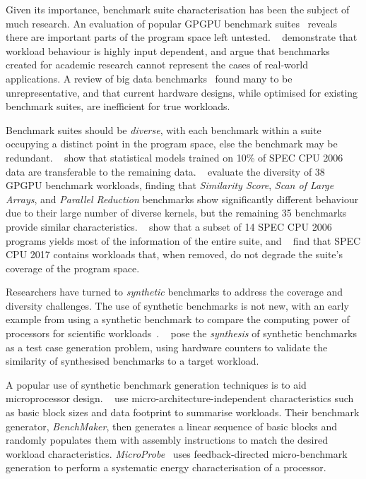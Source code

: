 Given its importance, benchmark suite characterisation has been the subject of much research. An evaluation of popular GPGPU benchmark suites~\cite{Ryoo2015} reveals there are important parts of the program space left untested. \citeauthor{Xiong2013}~\cite{Xiong2013} demonstrate that workload behaviour is highly input dependent, and argue that benchmarks created for academic research cannot represent the cases of real-world applications. A review of big data benchmarks~\cite{Ferdman2012} found many to be unrepresentative, and that current hardware designs, while optimised for existing benchmark suites, are inefficient for true workloads.

Benchmark suites should be \emph{diverse}, with each benchmark within a suite occupying a distinct point in the program space, else the benchmark may be redundant. \citeauthor{Ould-Ahmed-Vall2008}~\cite{Ould-Ahmed-Vall2008} show that statistical models trained on 10\% of SPEC CPU 2006 data are transferable to the remaining data. \citeauthor{Goswami2010}~\cite{Goswami2010} evaluate the diversity of 38 GPGPU benchmark workloads, finding that \emph{Similarity Score}, \emph{Scan of Large Arrays}, and \emph{Parallel Reduction} benchmarks show significantly different behaviour due to their large number of diverse kernels, but the remaining 35 benchmarks provide similar characteristics. \citeauthor{Phansalkar2007}~\cite{Phansalkar2007} show that a subset of 14 SPEC CPU 2006 programs yields most of the information of the entire suite, and \citeauthor{Draft2018}~\cite{Draft2018} find that SPEC CPU 2017 contains workloads that, when removed, do not degrade the suite's coverage of the program space.

Researchers have turned to \emph{synthetic} benchmarks to address the coverage and diversity challenges. The use of synthetic benchmarks is not new, with an early example from \citeyear{Curnow1976} using a synthetic benchmark to compare the computing power of processors for scientific workloads~\cite{Curnow1976}. \citeauthor{Bell2005}~\cite{Bell2005} pose the \emph{synthesis} of synthetic benchmarks as a test case generation problem, using hardware counters to validate the similarity of synthesised benchmarks to a target workload.

A popular use of synthetic benchmark generation techniques is to aid microprocessor design. \citeauthor{Joshi2008}~\cite{Joshi2008} use micro-architecture-independent characteristics such as basic block sizes and data footprint to summarise workloads. Their benchmark generator, \emph{BenchMaker}, then generates a linear sequence of basic blocks and randomly populates them with assembly instructions to match the desired workload characteristics. \emph{MicroProbe}~\cite{Bertran2012} uses feedback-directed micro-benchmark generation to perform a systematic energy characterisation of a processor.

